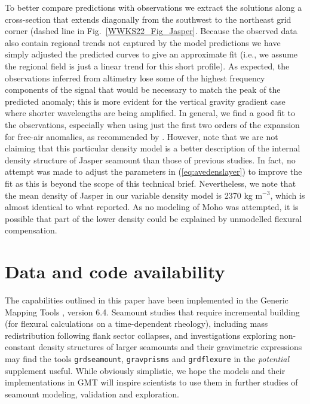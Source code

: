 To better compare predictions with observations we extract the solutions along a cross-section that extends diagonally
from the southwest to the northeast grid corner (dashed line in Fig.~\ref{WWKS22_Fig_Jasper}.  Because the observed data
also contain regional trends not captured by the model predictions we have simply adjusted the predicted curves to
give an approximate fit (i.e., we assume the regional field is just a linear trend for this short profile).  As expected,
the observations inferred from altimetry lose some of the highest frequency components of the signal that would be
necessary to match the peak of the predicted anomaly; this is more evident for the vertical gravity gradient case where shorter
wavelengths are being amplified.  In general, we find a good fit to the observations, especially when using just the first
two orders of the \citet{P1972} expansion for free-air anomalies, as recommended by \citet{MS2007}.  However, note that we
are not claiming that this particular density model is a better description of the  internal density structure of Jasper
seamount than those of previous studies.  In fact, no attempt was made to adjust the parameters in (\ref{eq:avedenslayer})
to improve the fit as this is beyond the scope of this technical brief. Nevertheless, we note that the mean density of Jasper in
our variable density model is 2370 kg m$^{-3}$, which is almost identical to what \citet{H1991} reported. As no modeling of
Moho was attempted, it is possible that part of the lower density could be explained by unmodelled flexural compensation.

\section{Data and code availability}

The capabilities outlined in this paper have been implemented in the Generic Mapping Tools \citep{Wetal2019}, version 6.4.
Seamount studies that require incremental building (for flexural calculations on a time-dependent rheology), including
mass redistribution following flank sector collapses, and investigations exploring non-constant density structures of larger
seamounts and their gravimetric expressions may find the tools \texttt{grdseamount}, \texttt{gravprisms} and \texttt{grdflexure}
in the {\it potential} supplement useful. While obviously simplistic, we hope the models and their implementations
in GMT will inspire scientists to use them in further studies of seamount modeling, validation and exploration.

